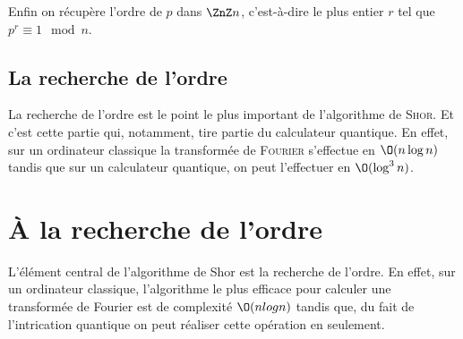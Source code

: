 \documentclass[a4paper,11pt]{tipe}
\begin{document}
Enfin on récupère l'ordre de $p$ dans $\ZnZ n$, c'est-à-dire le plus entier $r$
tel que $p ^ r \equiv 1 \mod n$.



\section{La recherche de l'ordre}
La recherche de l'ordre est le point le plus important de l'algorithme de
\textsc{Shor}. Et c'est cette partie qui, notamment, tire partie du calculateur
quantique. En effet, sur un ordinateur classique la transformée de
\textsc{Fourier} s'effectue en $\O(n\log n)$ tandis que sur un calculateur
quantique, on peut l'effectuer en $\O(\log ^ 3 n)$.


\chapter{À la recherche de l'ordre}
L'élément central de l'algorithme de Shor est la recherche de l'ordre. En
effet, sur un ordinateur classique, l'algorithme le plus efficace pour calculer
une transformée de Fourier est de complexité $\O(n log n)$ tandis que, du fait
de l'intrication quantique on peut réaliser cette opération en seulement.
\end{document}
